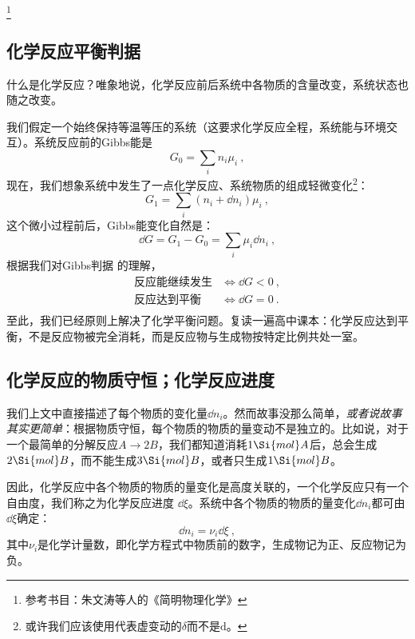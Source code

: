 
\begin{issues}
\issueDraft
\end{issues}

\footnote{参考书目：朱文涛等人的《简明物理化学》}
\subsection{化学反应平衡判据}
什么是化学反应？唯象地说，化学反应前后系统中各物质的含量改变，系统状态也随之改变。

我们假定一个始终保持等温等压的系统（这要求化学反应全程，系统能与环境交互）。系统反应前的Gibbs能是 
$$G_0 = \sum_i n_i \mu_i~,$$
现在，我们想象系统中发生了一点化学反应、系统物质的组成轻微变化\footnote{或许我们应该使用代表虚变动的$\delta$而不是$\mathrm{d}$。}：
$$G_1 = \sum_i (n_i + \dd n_i) \mu_i~,$$
这个微小过程前后，Gibbs能变化自然是：
\begin{equation}\label{eq_chemBl_2}
\dd G = G_1 - G_0 = \sum_i \mu_i \dd n_i~,
\end{equation}
根据我们对Gibbs判据  的理解，
\begin{equation}\label{eq_chemBl_1}
\begin{aligned}
\text{反应能继续发生} &\Longleftrightarrow \dd G < 0~,\\
\text{反应达到平衡} &\Longleftrightarrow \dd G = 0~.\\
\end{aligned}
\end{equation}
至此，我们已经原则上解决了化学平衡问题。复读一遍高中课本：化学反应达到平衡，不是反应物被完全消耗，而是反应物与生成物按特定比例共处一室。

\subsection{化学反应的物质守恒；化学反应进度}
我们上文中直接描述了每个物质的变化量$\dd n_i$。然而故事没那么简单，\textsl{或者说故事其实更简单}：根据物质守恒，每个物质的物质的量变动不是独立的。比如说，对于一个最简单的分解反应$A\to2B$，我们都知道消耗$1 \Si{mol} A$后，总会生成$2 \Si{mol} B$，而不能生成$3 \Si{mol} B$，或者只生成$1 \Si{mol} B$。

因此，化学反应中各个物质的物质的量变化是高度关联的，一个化学反应只有一个自由度，我们称之为化学反应进度 $\dd \xi$。系统中各个物质的物质的量变化$\dd n_i$都可由$\dd \xi$确定：
\begin{equation} \label{eq_chemBl_7}
\dd n_i = \nu_i \dd \xi~,
\end{equation}
其中$\nu_i$是化学计量数，即化学方程式中物质前的数字，生成物记为正、反应物记为负。

